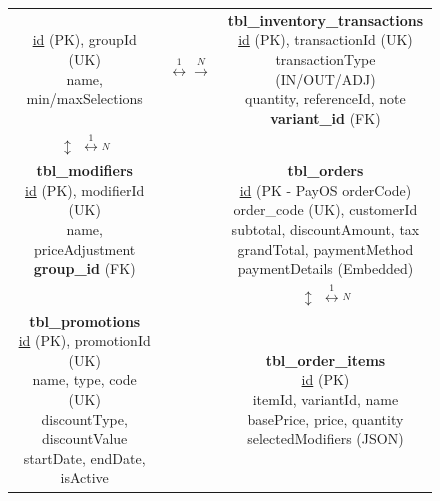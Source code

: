 \begin{figure}[H]
\begin{minipage}{0.95\textwidth}
{{\begin{tabularx}{\textwidth}{ccc}
{{            \underline{id} (PK), groupId (UK)\\
            name, min/maxSelections}}
            & $\stackrel{1}{\longleftrightarrow}\stackrel{N}{\longrightarrow}$ &
            \fbox{\parbox{4.5cm}{\centering \textbf{tbl\_inventory\_transactions}\\
            \underline{id} (PK), transactionId (UK)\\
            transactionType (IN/OUT/ADJ)\\
            quantity, referenceId, note\\
            \textbf{variant\_id} (FK)}} \\[8mm]
            $\updownarrow$ $\stackrel{1}{\longleftrightarrow}\stackrel{N}{}$ & & \\[2mm]
            \fbox{\parbox{3.5cm}{\centering \textbf{tbl\_modifiers}\\
            \underline{id} (PK), modifierId (UK)\\
            name, priceAdjustment\\
            \textbf{group\_id} (FK)}}
            & &
            \fbox{\parbox{4.5cm}{\centering \textbf{tbl\_orders}\\
            \underline{id} (PK - PayOS orderCode)\\
            order\_code (UK), customerId\\
            subtotal, discountAmount, tax\\
            grandTotal, paymentMethod\\
            paymentDetails (Embedded)}} \\[8mm]
            & & $\updownarrow$ $\stackrel{1}{\longleftrightarrow}\stackrel{N}{}$ \\[2mm]
            \fbox{\parbox{3.5cm}{\centering \textbf{tbl\_promotions}\\
            \underline{id} (PK), promotionId (UK)\\
            name, type, code (UK)\\
            discountType, discountValue\\
            startDate, endDate, isActive}}
            & &
            \fbox{\parbox{4.5cm}{\centering \textbf{tbl\_order\_items}\\
            \underline{id} (PK)\\
            itemId, variantId, name\\
            basePrice, price, quantity\\
            selectedModifiers (JSON)\\
}}
\end{tabularx}}}
\end{minipage}
\end{figure}
